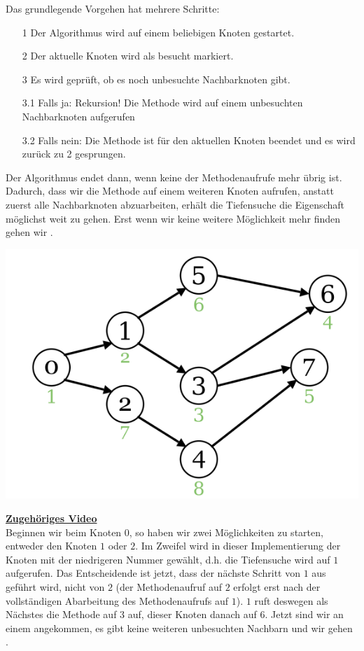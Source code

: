 \documentclass{article}
\begin{document}
Das grundlegende Vorgehen hat mehrere Schritte:
\begin{enumerate}
    \item[1] Der Algorithmus wird auf einem beliebigen Knoten gestartet.
    \item[2] Der aktuelle Knoten wird als besucht markiert. 
    \item[3] Es wird geprüft, ob es noch unbesuchte Nachbarknoten gibt. 
    \item[3.1] Falls ja: Rekursion! Die Methode wird auf einem unbesuchten Nachbarknoten aufgerufen
    \item[3.2] Falls nein: Die Methode ist für den aktuellen Knoten beendet und es wird zurück zu 2 gesprungen.  
\end{enumerate}
Der Algorithmus endet dann, wenn keine der Methodenaufrufe mehr übrig ist. Dadurch, dass wir die Methode auf einem weiteren Knoten aufrufen, anstatt zuerst alle Nachbarknoten abzuarbeiten, erhält die Tiefensuche die Eigenschaft möglichst weit  zu gehen. Erst wenn wir keine weitere Möglichkeit mehr finden gehen wir .
\begin{center}
    \includegraphics[scale=0.35]{../media/depth_search.png}
\end{center}
\href{https://youtu.be/nM9hBCUMXMA}{\textbf{Zugehöriges Video}}\\
Beginnen wir beim Knoten $0$, so haben wir zwei Möglichkeiten zu starten, entweder den Knoten $1$ oder $2$. Im Zweifel wird in dieser Implementierung der Knoten mit der niedrigeren Nummer gewählt, d.h. die Tiefensuche wird auf $1$ aufgerufen. Das Entscheidende ist jetzt, dass der nächste Schritt von $1$ aus geführt wird, nicht von $2$ (der Methodenaufruf auf $2$ erfolgt erst nach der vollständigen Abarbeitung des Methodenaufrufs auf $1$). $1$ ruft deswegen als Nächstes die Methode auf $3$ auf, dieser Knoten danach auf $6$. Jetzt sind wir an einem  angekommen, es gibt keine weiteren unbesuchten Nachbarn und wir gehen . \\
\end{document}
